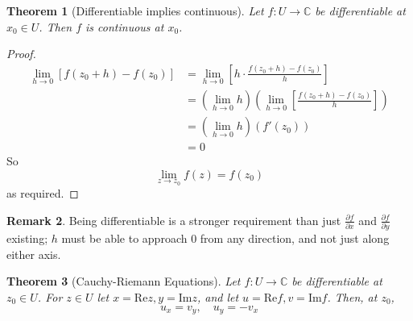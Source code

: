 \documentclass[10pt,fleqn]{article}
\newcommand{\comps}{\mathbb{C}}
\newcommand{\re}{\mathrm{Re}}
\newcommand{\im}{\mathrm{Im}}
\theoremstyle{definition} \newtheorem{defn}{Definition}[section]
\theoremstyle{plain}      \newtheorem{thm}[defn]{Theorem}
\theoremstyle{definition} \newtheorem{prop}[defn]{Proposition}
\theoremstyle{plain}      \newtheorem{lem}[defn]{Lemma}
\theoremstyle{definition} \newtheorem{cor}[defn]{Corollary}
\theoremstyle{definition} \newtheorem{ex}[defn]{Example}
\theoremstyle{definition} \newtheorem{rem}[defn]{Remark}
\begin{document}
\begin{thm}[Differentiable implies continuous]
    Let $f:U\to\comps$ be differentiable at $x_0\in U$.
    Then $f$ is continuous at $x_0$.
\end{thm}

\begin{proof}
    \begin{align*}
        \lim_{h\to0} [f(z_0+h)-f(z_0)]
        &=
        \lim_{h\to0} \left[h\cdot\frac{f(z_0+h)-f(z_0)}{h}\right]\\
        &=
        (\lim_{h\to0} h)(\lim_{h\to0}\left[\frac{f(z_0+h)-f(z_0)}{h}\right])\\
        &=
        (\lim_{h\to0} h)(f'(z_0))\\
        &=
        0
    \end{align*}
    So
    \[
        \lim_{z\to z_0}f(z)=
        f(z_0)
    \]
    as required.
\end{proof}

\begin{rem}
    Being differentiable is a stronger requirement than just $\frac{\partial f}{\partial x}$ and $\frac{\partial f}{\partial y}$ existing; $h$ must be able to approach 0 from any direction, and not just along either axis.
\end{rem}

\begin{thm}[Cauchy-Riemann Equations]
    Let $f:U\to\comps$ be differentiable at $z_0\in U$.
    For $z\in U$ let $x=\re z, y=\im z$, and let $u=\re f,v=\im f$.
    Then, at $z_0$,
    \[
        u_x=v_y,\quad
        u_y=-v_x
    \]
\end{thm}
\end{document}
